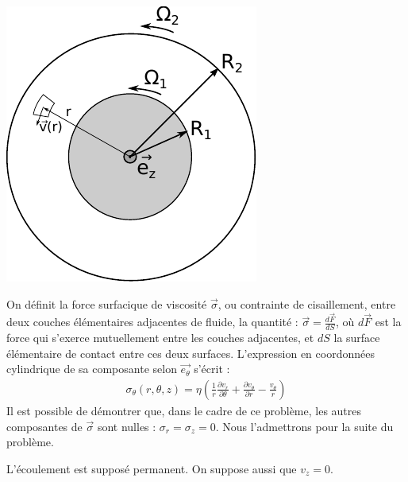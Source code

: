 \documentclass{report}
\begin{document}
\begin{center}
	\includegraphics[scale=0.8]{meca_flu3.pdf}
\end{center}

On définit la force surfacique de viscosité $\vec{\sigma}$, ou contrainte de cisaillement, entre deux couches élémentaires adjacentes de fluide, la quantité : $\vec{\sigma}=\frac{d\vec{F}}{dS}$,
où $d\vec{F}$ est la force qui s'exerce mutuellement entre les couches adjacentes, et $dS$ la surface élémentaire de contact entre ces deux surfaces. L'expression en coordonnées cylindrique de sa composante selon $\vec{e_\theta}$ s'écrit : 
\begin{align*}
	\sigma_\theta(r,\theta,z)=\eta\left(\frac{1}{r}\frac{\partial v_r}{\partial \theta}+ \frac{\partial v_\theta}{\partial r} - \frac{v_\theta}{r} \right)
\end{align*}
Il est possible de démontrer que, dans le cadre de ce problème, les autres composantes de $\vec{\sigma}$ sont nulles : $\sigma_r=\sigma_z=0$. Nous l'admettrons pour la suite du problème. 

L'écoulement est supposé permanent. On suppose aussi que $v_z=0$.
\end{document}
